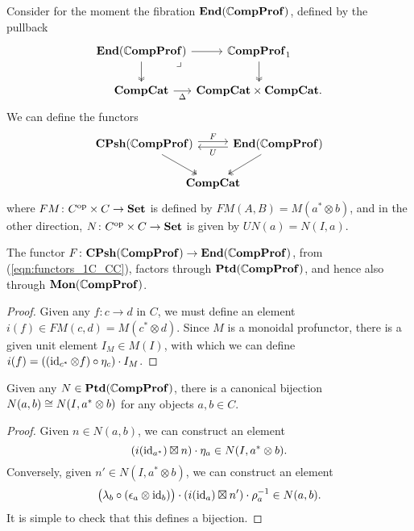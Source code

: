 \documentclass[12pt,oneside,article,draft]{memoir}
\begin{document}
Consider for the moment the fibration $\mathbf{End}(\mathbb{C}\mathbf{ompProf})$, defined by the pullback
\begin{equation*}
   \begin{tikzcd}[column sep=0em]
      \End(\dCompProf) \ar[d,two heads] \ar[r] \ar[dr,phantom,"\lrcorner" very near start]
         & \dCompProf_1 \ar[d,two heads] \\
      \CompCat \ar[r,"\Delta"']
         & \CompCat\times\CompCat.
   \end{tikzcd}
\end{equation*}
We can define the functors
\begin{equation}\label{eqn:functors_1C_CC}
   \begin{tikzcd}[column sep=-1.5em]
      \CPsh(\dCompProf) \ar[rr,shift left,"F"] \ar[dr,two heads]
      && \End(\dCompProf) \ar[ll,shift left,"U"] \ar[dl,two heads] \\
      & \CompCat &
   \end{tikzcd}
\end{equation}
where $FM\colon{C}^{\text{op}}\times C\to\mathbf{Set}$ is defined by $FM(A,B)=M(a^*\otimes b)$, and in the
other direction, $N\colon{C}^{\text{op}}\times C\to\mathbf{Set}$ is given by $UN(a)=N(I,a)$.

\begin{proposition}\label{Prop:canonical unit}
   The functor $F\colon\mathbf{CPsh}(\mathbb{C}\mathbf{ompProf})\to\mathbf{End}(\mathbb{C}\mathbf{ompProf})$, from (\ref{eqn:functors_1C_CC}),
   factors through $\mathbf{Ptd}(\mathbb{C}\mathbf{ompProf})$, and hence also through $\mathbf{Mon}(\mathbb{C}\mathbf{ompProf})$.
\end{proposition}
\begin{proof}
   Given any $f\colon c\to d$ in $ C$, we must define an element $i(f)\in FM(c,d)=M(c^*\otimes
   d)$. Since $M$ is a monoidal profunctor, there is a given unit element $I_M\in M(I)$, with which
   we can define $i(f)=((\operatorname{id}_{c^*}\otimes f)\circ\eta_c)\cdot I_M$.
\end{proof}

\begin{lemma}\label{Lem:comp prof bijection}
   Given any $N\in\mathbf{Ptd}(\mathbb{C}\mathbf{ompProf})$, there is a canonical bijection $N(a,b)\cong N(I,a^*\otimes b)$ for
   any objects $a,b\in C$.
\end{lemma}
\begin{proof}
   Given $n\in N(a,b)$, we can construct an element
   \[
      (i(\operatorname{id}_{a^*})\boxtimes n)\cdot\eta_a \in N(I,a^*\otimes b).
   \]
   Conversely, given $n'\in N(I,a^*\otimes b)$, we can construct an element
   \[
      \bigl(\lambda_b\circ(\epsilon_a\otimes\operatorname{id}_b)\bigr)\cdot(i(\operatorname{id}_a)\boxtimes n')\cdot\rho_a^{-1} \in N(a,b).
   \]
   It is simple to check that this defines a bijection.
\end{proof}
\end{document}
